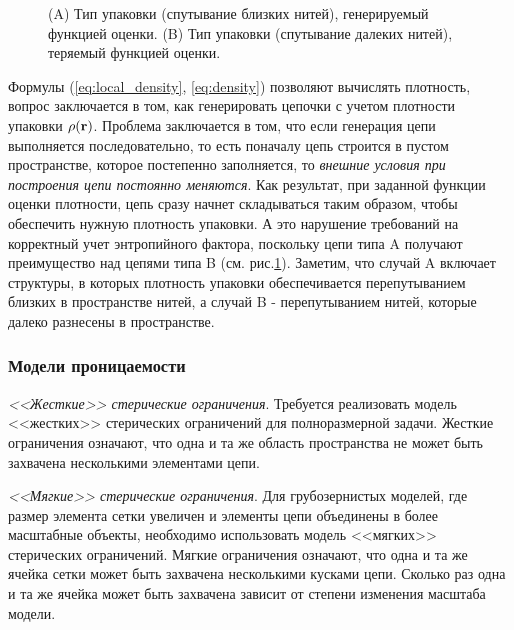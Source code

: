 \documentclass[tikz,a4paper]{scrartcl} %
\begin{document}
\begin{figure}[h]
\caption{(A) Тип упаковки (спутывание близких нитей), генерируемый функцией оценки. (B) Тип упаковки (спутывание далеких нитей), теряемый функцией оценки.}
\label{pic:fold}
\end{figure}
 
Формулы (\ref{eq:local_density}, \ref{eq:density}) позволяют вычислять плотность, вопрос заключается в том, как генерировать цепочки с учетом плотности упаковки $\rho(\bold r)$. Проблема заключается в том, что если генерация цепи выполняется последовательно, то есть поначалу цепь строится в пустом пространстве, которое постепенно заполняется, то \textit{внешние условия при построения цепи постоянно меняются}. Как результат, при заданной функции оценки плотности, цепь сразу начнет складываться таким образом, чтобы обеспечить нужную плотность упаковки. А это нарушение требований на корректный учет энтропийного фактора, поскольку цепи типа A получают преимущество над цепями типа B (см. рис.\ref{pic:fold}). Заметим, что случай A включает структуры, в которых плотность упаковки обеспечивается перепутыванием близких в пространстве нитей, а случай B - перепутыванием нитей, которые далеко разнесены в пространстве.

\subsubsection*{Модели проницаемости}
\textit{<<Жесткие>> стерические ограничения}. Требуется реализовать модель <<жестких>> стерических ограничений для полноразмерной задачи. Жесткие ограничения означают, что одна и та же область пространства не может быть захвачена несколькими элементами цепи.

\textit{<<Мягкие>> стерические ограничения}. Для грубозернистых моделей, где размер элемента сетки увеличен и элементы цепи объединены в более масштабные объекты, необходимо использовать модель <<мягких>> стерических ограничений. Мягкие ограничения означают, что одна и та же ячейка сетки может быть захвачена несколькими кусками цепи. Сколько раз одна и та же ячейка может быть захвачена зависит от степени изменения масштаба модели.
\end{document}
